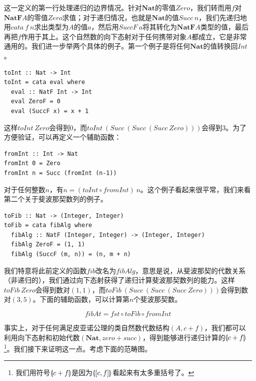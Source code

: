 \documentclass[b5paper]{ctexart}
\begin{document}
这一定义的第一行处理递归的边界情况。针对$\mathbf{Nat}$的零值$Zero$，我们转而用$f$对$\mathbf{NatF}A$的零值$Zero$求值；对于递归情况，也就是$\mathbf{Nat}$的值$Succ\ n$，我们先递归地用$cata\ f\ n$求出类型为$A$的值$a$，然后用$SuccF\ a$将其转化为$\mathbf{NatF}A$类型的值，最后再把$f$作用于其上。这个自然数的向下态射对于任何携带对象$A$都成立，它是非常通用的。我们进一步举两个具体的例子。第一个例子是将任何$\mathbf{Nat}$的值转换回$Int$。

\lstset{frame=single}
\begin{lstlisting}[style=Haskell]
toInt :: Nat -> Int
toInt = cata eval where
  eval :: NatF Int -> Int
  eval ZeroF = 0
  eval (SuccF x) = x + 1
\end{lstlisting}

这样$toInt\ Zero$会得到0，而$toInt\ (Succ\ (Succ\ (Succ\ Zero)))$会得到3。为了方便验证，可以再定义一个辅助函数：

\begin{lstlisting}[style=Haskell]
fromInt :: Int -> Nat
fromInt 0 = Zero
fromInt n = Succ (fromInt (n-1))
\end{lstlisting}

对于任何整数$n$，有$n = (toInt \circ fromInt)\ n$。这个例子看起来很平常，我们来看第二个关于斐波那契数列的例子。

\begin{lstlisting}[style=Haskell]
toFib :: Nat -> (Integer, Integer)
toFib = cata fibAlg where
  fibAlg :: NatF (Integer, Integer) -> (Integer, Integer)
  fibAlg ZeroF = (1, 1)
  fibAlg (SuccF (m, n)) = (n, m + n)
\end{lstlisting}

我们特意将此前定义的函数$fib$改名为$fibAlg$，意思是说，从斐波那契的代数关系（非递归的），我们通过向下态射获得了递归计算斐波那契数列的能力。这样$toFib\ Zero$会得到数对$(1, 1)$，而$toFib\ (Succ\ (Succ\ (Succ\ Zero)))$会得到数对$(3, 5)$。下面的辅助函数，可以计算第$n$个斐波那契数。

\[
fibAt = fst \circ toFib \circ fromInt
\]

事实上，对于任何满足皮亚诺公理的类自然数代数结构$(A, c + f)$，我们都可以利用向下态射和初始代数$(\mathbf{Nat}, zero + succ)$，得到能够进行递归计算的$\llparenthesis c + f \rrparenthesis$\footnote{我们用符号$\llparenthesis c + f \rrparenthesis$是因为$\llparenthesis [c, f] \rrparenthesis$看起来有太多重括号了。}。我们接下来证明这一点。考虑下面的范畴图。

\begin{center}
\end{center}
\end{document}
